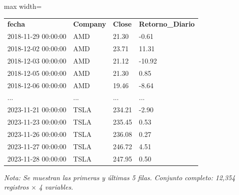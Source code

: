 

\begin{table}[htbp]

\centering

\begin{adjustbox}{max width=\textwidth}

\begin{tabular}{llll}

\rowcolor{ThemeBackground}
\rule{0pt}{0.45cm}
\textcolor{ThemeGold}{\bfseries fecha} & \textcolor{ThemeGold}{\bfseries Company} & \textcolor{ThemeGold}{\bfseries Close} & \textcolor{ThemeGold}{\bfseries Retorno\_Diario} \\

2018-11-29 00:00:00 & AMD & 21.30 & -0.61 \\
2018-12-02 00:00:00 & AMD & 23.71 & 11.31 \\
2018-12-03 00:00:00 & AMD & 21.12 & -10.92 \\
2018-12-05 00:00:00 & AMD & 21.30 & 0.85 \\
2018-12-06 00:00:00 & AMD & 19.46 & -8.64 \\
... & ... & ... & ... \\
2023-11-21 00:00:00 & TSLA & 234.21 & -2.90 \\
2023-11-23 00:00:00 & TSLA & 235.45 & 0.53 \\
2023-11-26 00:00:00 & TSLA & 236.08 & 0.27 \\
2023-11-27 00:00:00 & TSLA & 246.72 & 4.51 \\
2023-11-28 00:00:00 & TSLA & 247.95 & 0.50 \\
\bottomrule
\end{tabular}

\end{adjustbox}

\vspace{0.15cm}
{\raggedright\sffamily\footnotesize\color{ThemeMuted}
\textit{Nota: Se muestran las primeras y últimas 5 filas. Conjunto completo: 12,354 registros $\times$ 4 variables.}}

\end{table}
